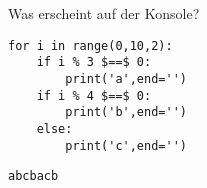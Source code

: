 \question[3] Was erscheint auf der Konsole?
\begin{lstlisting}
for i in range(0,10,2):
    if i % 3 $==$ 0:
        print('a',end='')
    if i % 4 $==$ 0:
        print('b',end='')
    else:
        print('c',end='')
\end{lstlisting}
\begin{solutionbox}{1cm}
\texttt{abcbacb}
\end{solutionbox}
